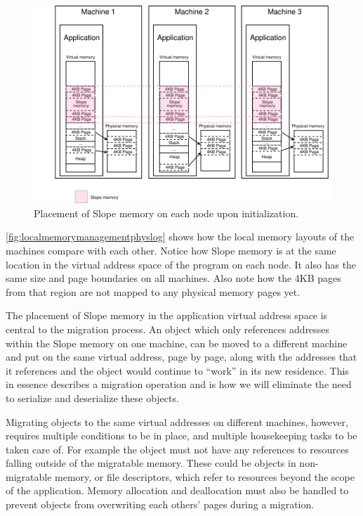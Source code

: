 \begin{figure}[t]
\centering
{}
\includegraphics[width=1\textwidth]{local-memory-management-phys-log.drawio}
\caption{
    Placement of Slope memory on each node upon initialization.
}
\label{fig:localmemorymanagementphyslog}
\end{figure}

\autoref{fig:localmemorymanagementphyslog} shows how the local memory layouts
of the machines compare with each other. Notice how Slope memory is at the
same location in the virtual address space of the program on each node.
It also has the same size and page boundaries on all machines. Also note how
the 4KB pages from that region are not mapped to any physical memory pages
yet.

The placement of Slope memory in the application virtual address space is
central to the migration process. An object which only references addresses
within the Slope memory on one machine, can be moved to a different machine
and put on the same virtual address, page by page, along with the addresses
that it references and the object would continue to ``work'' in its new
residence. This in essence describes a migration operation and is how we will
eliminate the need to serialize and deserialize these objects.

Migrating objects to the same virtual addresses on different machines,
however, requires multiple conditions to be in place, and multiple
housekeeping tasks to be taken care of. For example the object must not have
any references to resources falling outside of the migratable memory. These
could be objects in non-migratable memory, or file descriptors, which refer
to resources beyond the scope of the application. Memory allocation
and deallocation must also be handled to prevent objects from overwriting each
others' pages during a migration.

